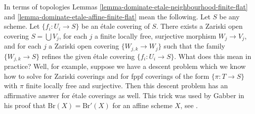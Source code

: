 \begin{remark}
\label{remark-topologies}
In terms of topologies
Lemmas \ref{lemma-dominate-etale-neighbourhood-finite-flat} and
\ref{lemma-dominate-etale-affine-finite-flat} mean the following.
Let $S$ be any scheme. Let $\{f_i : U_i \to S\}$ be an \'etale covering
of $S$. There exists a Zariski open covering $S = \bigcup V_j$,
for each $j$ a finite locally free, surjective morphism
$W_j \to V_j$, and for each $j$ a Zariski open covering
$\{W_{j, k} \to W_j\}$ such that the family
$\{W_{j, k} \to S\}$ refines the given \'etale covering
$\{f_i : U_i \to S\}$. What does this mean in practice?
Well, for example, suppose we have a descent problem which we
know how to solve for Zariski coverings and for fppf coverings
of the form $\{\pi : T \to S\}$ with $\pi$ finite locally free
and surjective. Then this descent problem has an affirmative
answer for \'etale coverings as well. This trick was used by
Gabber in his proof that $\text{Br}(X) = \text{Br}'(X)$
for an affine scheme $X$, see \cite{Hoobler}.
\end{remark}